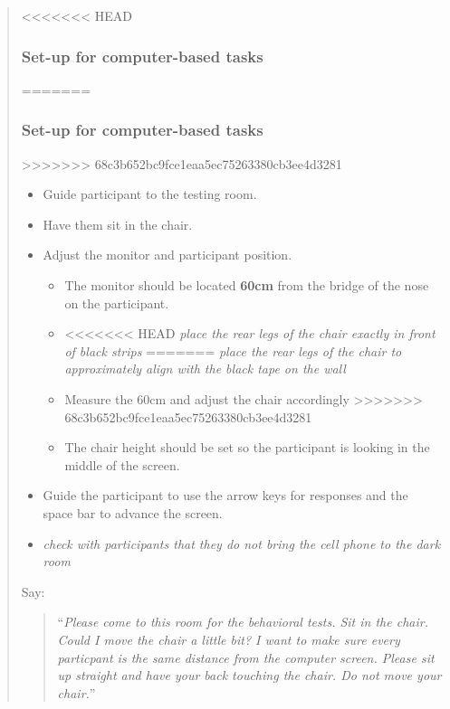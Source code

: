 \documentclass[]{article}
\providecommand{\tightlist}{%
  \setlength{\itemsep}{0pt}\setlength{\parskip}{0pt}}
\begin{document}
\begin{quote}
<<<<<<< HEAD
\subsubsection{Set-up for computer-based
tasks}\label{set-up-for-computer-based-tasks-1}
=======
\hypertarget{set-up-for-computer-based-tasks-1}{%
\subsubsection{Set-up for computer-based
tasks}\label{set-up-for-computer-based-tasks-1}}
>>>>>>> 68c3b652bc9fce1eaa5ec75263380cb3ee4d3281

\begin{itemize}
\tightlist
\item
  Guide participant to the testing room.
\item
  Have them sit in the chair.
\item
  Adjust the monitor and participant position.

  \begin{itemize}
  \tightlist
  \item
    The monitor should be located \textbf{60cm} from the bridge of the
    nose on the participant.
  \item
<<<<<<< HEAD
    \emph{place the rear legs of the chair exactly in front of black
    strips}
=======
    \emph{place the rear legs of the chair to approximately align with
    the black tape on the wall}
  \item
    Measure the 60cm and adjust the chair accordingly
>>>>>>> 68c3b652bc9fce1eaa5ec75263380cb3ee4d3281
  \item
    The chair height should be set so the participant is looking in the
    middle of the screen.
  \end{itemize}
\item
  Guide the participant to use the arrow keys for responses and the
  space bar to advance the screen.
\item
  \emph{check with participants that they do not bring the cell phone to
  the dark room}
\end{itemize}

Say:

\begin{quote}
``\emph{Please come to this room for the behavioral tests. Sit in the
chair. Could I move the chair a little bit? I want to make sure every
particpant is the same distance from the computer screen. Please sit up
straight and have your back touching the chair. Do not move your
chair.}''
\end{quote}


\end{quote}
\end{document}
